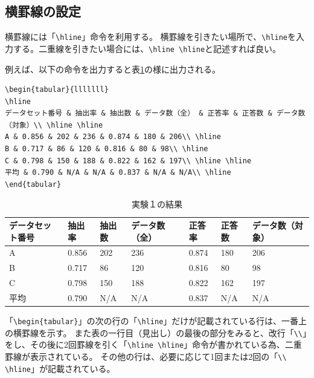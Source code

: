 \subsection{横罫線の設定}
横罫線には「\verb+\hline+」命令を利用する。
横罫線を引きたい場所で、\verb+\hline+を入力する。二重線を引きたい場合には、\verb+\hline \hline+と記述すれば良い。

例えば、以下の命令を出力すると表\ref{table:resultEx1b}の様に出力される。
\begin{breakbox}
{\small
\begin{verbatim}
\begin{tabular}{lllllll}
\hline
データセット番号 & 抽出率 & 抽出数 & データ数（全） & 正答率 & 正答数 & データ数（対象）\\ \hline \hline
A & 0.856 & 202 & 236 & 0.874 & 180 & 206\\ \hline
B & 0.717 & 86 & 120 & 0.816 & 80 & 98\\ \hline
C & 0.798 & 150 & 188 & 0.822 & 162 & 197\\ \hline \hline
平均 & 0.790 & N/A & N/A & 0.837 & N/A & N/A\\ \hline
\end{tabular}
\end{verbatim}
}
\end{breakbox}

\begin{table}[H]
\caption{実験１の結果}
\centering
\begin{tabular}{lllllll}
\hline
データセット番号 & 抽出率 & 抽出数 & データ数（全） & 正答率 & 正答数 & データ数（対象）\\ \hline \hline
A & 0.856 & 202 & 236 & 0.874 & 180 & 206\\ \hline
B & 0.717 & 86 & 120 & 0.816 & 80 & 98\\ \hline
C & 0.798 & 150 & 188 & 0.822 & 162 & 197\\ \hline \hline
平均 & 0.790 & N/A & N/A & 0.837 & N/A & N/A\\ \hline
\end{tabular}
\label{table:resultEx1b}
\end{table}

「\verb+\begin{tabular}+」の次の行の「\verb+\hline+」だけが記載されている行は、一番上の横罫線を示す。
また表の一行目（見出し）の最後の部分をみると、改行「\verb+\\+」をし、その後に2回罫線を引く「\verb+\hline \hline+」命令が書かれている為、二重罫線が表示されている。
その他の行は、必要に応じて1回または2回の「\verb+\\ \hline+」が記載されている。

